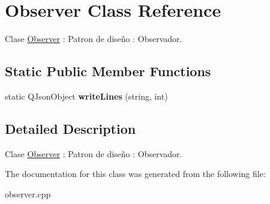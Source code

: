 \hypertarget{classObserver}{}\section{Observer Class Reference}
\label{classObserver}


Clase \hyperlink{classObserver}{Observer} \+: Patron de diseño \+: Observador.  


\subsection*{Static Public Member Functions}
\begin{DoxyCompactItemize}
\item 
static Q\+Json\+Object {\bfseries write\+Lines} (string, int)\hypertarget{classObserver_ad6a3bef8ffce667fad6ef3140f77f51b}{}\label{classObserver_ad6a3bef8ffce667fad6ef3140f77f51b}

\end{DoxyCompactItemize}


\subsection{Detailed Description}
Clase \hyperlink{classObserver}{Observer} \+: Patron de diseño \+: Observador. 

The documentation for this class was generated from the following file\+:\begin{DoxyCompactItemize}
\item 
observer.\+cpp\end{DoxyCompactItemize}
